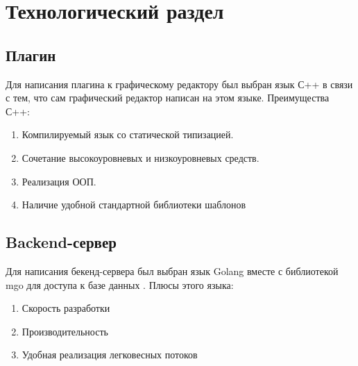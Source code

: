 \chapter{Технологический раздел}
\section{Плагин}
Для написания плагина к графическому редактору был выбран язык С++  в связи с тем, что сам графический редактор написан на этом языке. Преимущества С++:
\begin{enumerate}
	 \item Компилируемый язык со статической типизацией. 
	 \item Сочетание высокоуровневых и низкоуровневых средств.
	 \item Реализация ООП.
	 \item Наличие удобной стандартной библиотеки шаблонов
	 \end{enumerate}
	 
\section{Backend-сервер}
	 Для написания бекенд-сервера был выбран язык Golang вместе с библиотекой  mgo для доступа к базе данных . Плюсы этого языка:
	 \begin{enumerate}
	 	\item Скорость разработки	 	
	 	\item Производительность
	 	\item Удобная реализация легковесных потоков \cite{book5}

	 \end{enumerate}

